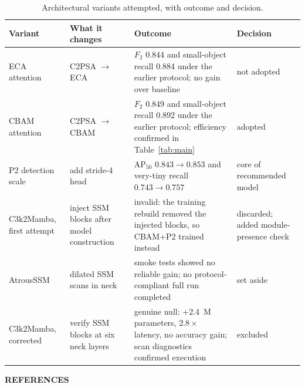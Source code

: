 \documentclass[12pt,a4paper,oneside]{report}
\begin{document}
\begin{table}[tbp]
  \centering
  \caption{Architectural variants attempted, with outcome and decision.}
  \label{tab:apphistory}
  \small
  \setlength{\tabcolsep}{3pt}
  \begin{tabular}{|p{2.4cm}|p{3.5cm}|p{5.1cm}|p{2.7cm}|}
    \hline
    \bfseries\boldmath Variant & \bfseries\boldmath What it changes & \bfseries\boldmath Outcome & \bfseries\boldmath Decision \\
    \hline
    ECA attention & C2PSA $\to$ ECA & $F_2$ 0.844 and small-object recall 0.884 under the earlier protocol; no gain over baseline & not adopted \\ \hline
    CBAM attention & C2PSA $\to$ CBAM & $F_2$ 0.849 and small-object recall 0.892 under the earlier protocol; efficiency confirmed in Table~\ref{tab:main} & adopted \\ \hline
    P2 detection scale & add stride-4 head & $\mathrm{AP}_{50}$ $0.843 \to 0.853$ and very-tiny recall $0.743 \to 0.757$ & core of recommended model \\ \hline
    C3k2Mamba, first attempt & inject SSM blocks after model construction & invalid: the training rebuild removed the injected blocks, so CBAM+P2 trained instead & discarded; added module-presence check \\ \hline
    AtrousSSM & dilated SSM scans in neck & smoke tests showed no reliable gain; no protocol-compliant full run completed & set aside \\ \hline
    C3k2Mamba, corrected & verify SSM blocks at six neck layers & genuine null: $+2.4$~M parameters, $2.8\times$ latency, no accuracy gain; scan diagnostics confirmed execution & excluded \\
    \hline
  \end{tabular}
\end{table}

\clearpage
{}
{}
\begin{center}{\fontsize{14}{21}\selectfont\bfseries REFERENCES}\end{center}
\printbibliography[heading=none]
\end{document}
